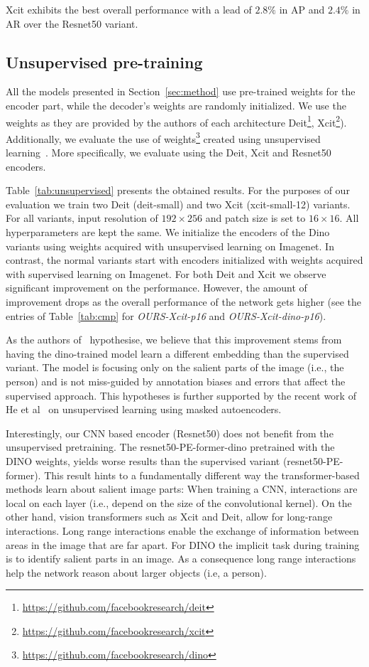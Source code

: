 \documentclass[runningheads]{llncs}
\begin{document}
Xcit exhibits the best overall performance with a lead of $2.8\%$ in AP and $2.4\%$ in AR over the Resnet50 variant.


\subsection{Unsupervised pre-training}
\label{sec:exp_unsupervised}
All the models presented in Section~\ref{sec:method} use pre-trained 
weights for the encoder part, while the decoder's weights are randomly initialized.
We use the weights as they are provided by the authors of each architecture 
Deit\footnote{\url{https://github.com/facebookresearch/deit}},
Xcit\footnote{\url{https://github.com/facebookresearch/xcit}}). 
Additionally, we evaluate the use of weights\footnote{\url{https://github.com/facebookresearch/dino}}
created using unsupervised learning~\cite{caron2021emerging}.
More specifically, we evaluate using the Deit, Xcit and Resnet50 encoders.

Table~\ref{tab:unsupervised} presents the obtained results.
For the purposes of our evaluation we train two Deit (deit-small) and two Xcit (xcit-small-12) variants. For all variants, input resolution of $192 \times 256$ and patch size is set to $16 \times 16$. All hyperparameters are kept the same. We initialize the encoders of the Dino 
variants using weights acquired with unsupervised learning on Imagenet. In contrast, the normal variants start with encoders initialized with weights acquired with supervised learning on Imagenet. For both Deit and Xcit we observe significant improvement on the performance. 
However, the amount of improvement drops as the overall performance of the network gets higher (see the entries of Table~\ref{tab:cmp} for \emph{OURS-Xcit-p16} and \emph{OURS-Xcit-dino-p16}).

As the authors of~\cite{caron2021emerging} hypothesise, we believe that this improvement 
stems from having the dino-trained model learn a different embedding than the supervised variant. 
The model is focusing only on the salient parts of the image (i.e., the person) and is not miss-guided by  annotation biases and errors that affect the supervised approach. This hypotheses is further supported by the recent work of He et al~\cite{he2021masked} on unsupervised learning using masked autoencoders.

Interestingly, our CNN based encoder (Resnet50) does not benefit from the unsupervised pretraining. The resnet50-PE-former-dino pretrained with the DINO weights, yields worse results than the supervised
variant (resnet50-PE-former). This result hints to a fundamentally different way the transformer-based methods learn about salient image parts:
When training a CNN, interactions are local on each layer (i.e., depend on the size of the convolutional kernel). 
On the other hand, vision transformers such as Xcit and Deit, allow for long-range interactions. Long range interactions enable the exchange of information between areas in the image that are far apart. For DINO the implicit task during training is to identify salient parts in an image. As a consequence long range interactions help the network reason about larger objects (i.e, a person).
\end{document}
